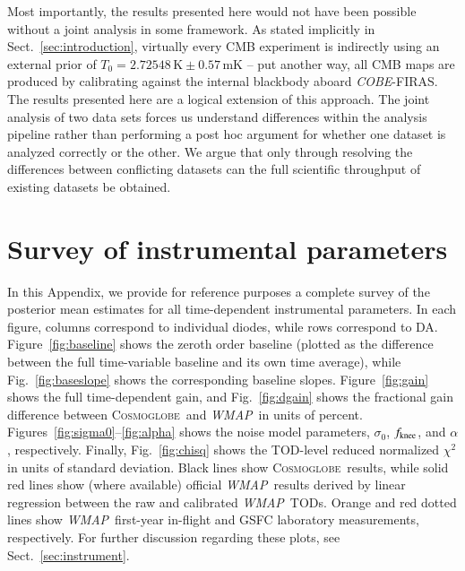 \documentclass[twocolumn]{../../common/aa}
\def\WMAP{\emph{WMAP}}
\def\COBE{\emph{COBE}}
\newcommand{\cosmoglobe}{\textsc{Cosmoglobe}}
\begin{document}
Most importantly, the results presented here would not have been possible without a joint analysis in some framework. As stated implicitly in Sect.~\ref{sec:introduction}, virtually every CMB experiment is indirectly using an external prior of $T_0=2.72548\,\mathrm K\pm0.57\,\mathrm{mK}$ \citep{fixsen2009} -- put another way, all CMB maps are produced by calibrating against the internal blackbody aboard \COBE-FIRAS. The results presented here are a logical extension of this approach. The joint analysis of two data sets forces us understand differences within the analysis pipeline rather than performing a post hoc argument for whether one dataset is analyzed correctly or the other. We argue that only through resolving the differences between conflicting datasets can the full scientific throughput of existing datasets be obtained.



















\appendix

\section{Survey of instrumental parameters}
\label{sec:survey}

\noindent\begin{minipage}{\textwidth}
In this Appendix, we provide for reference purposes a complete survey of the posterior mean estimates for all time-dependent instrumental parameters. In each figure, columns correspond to individual diodes, while rows correspond to DA. Figure~\ref{fig:baseline} shows the zeroth order baseline (plotted as the difference between the full time-variable baseline and its own time average), while Fig.~\ref{fig:baseslope} shows the corresponding baseline slopes. Figure~\ref{fig:gain} shows the full time-dependent gain, and Fig.~\ref{fig:dgain} shows the fractional gain difference between \cosmoglobe\ and \WMAP\ in units of percent. Figures~\ref{fig:sigma0}--\ref{fig:alpha} shows the noise model parameters, $\sigma_0$, $\fknee$, and $\alpha$, respectively. Finally, Fig.~\ref{fig:chisq} shows the TOD-level reduced normalized $\chi^2$ in units of standard deviation. Black lines show \cosmoglobe\ results, while solid red lines show (where available) official \WMAP\ results derived by linear regression between the raw and calibrated \WMAP\ TODs. Orange and red dotted lines show \WMAP\ first-year in-flight and GSFC laboratory measurements, respectively. For further discussion regarding these plots, see Sect.~\ref{sec:instrument}.
\end{minipage}
\end{document}
